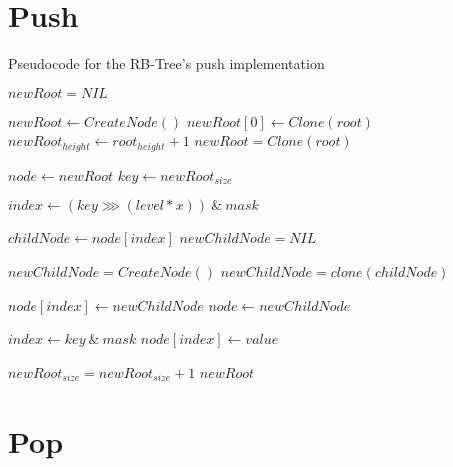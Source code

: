\section{Push} 

\begin{listing}[ht!]    
    \label{lst:rb-tree-push}
    \caption{Pseudocode for the RB-Tree's push implementation}
    
    \begin{algorithmic}
            \State $newRoot = NIL$

                \State $newRoot \leftarrow CreateNode()$
                \State $newRoot[0] \leftarrow Clone(root)$
                \State $newRoot_{height} \leftarrow root_{height} + 1$
            \Else 
                \State $newRoot = Clone(root)$
            \EndIf
                        
            \State $node \leftarrow newRoot$
            \State $key \leftarrow newRoot_{size}$
    
                \State $index \leftarrow (key \ggg (level * x))\ \&\ mask$
                
                \State $childNode \leftarrow node[index]$
                \State $newChildNode = NIL$

                    \State $newChildNode = CreateNode()$
                \Else
                    \State $newChildNode = clone(childNode)$
                \EndIf
                
                \State $node[index] \leftarrow newChildNode$
                \State $node \leftarrow newChildNode$
            \EndFor        
    
            \State $index \leftarrow key\ \&\ mask$
            \State $node[index] \leftarrow value$ 

            \State $newRoot_{size} = newRoot_{size} + 1$
            \State \Return $newRoot$
        \EndFunction
    \end{algorithmic}
\end{listing}

\section{Pop}
